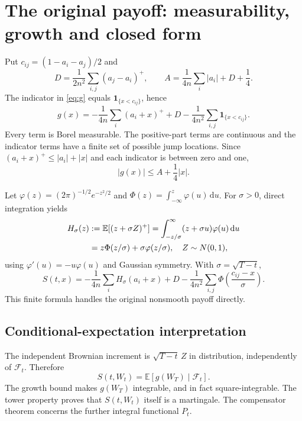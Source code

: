 \documentclass[11pt,letterpaper]{article}
\newcommand{\E}{\mathbb E}
\newcommand{\F}{\mathcal F}
\newcommand{\dd}{\,\mathrm d}
\newcommand{\ind}{\mathbf1}
\begin{document}
\section{The original payoff: measurability, growth and closed form}
Put $c_{ij}=(1-a_i-a_j)/2$ and
\begin{equation}\label{eq:constants}
D=\frac1{2n^2}\sum_{i,j}(a_j-a_i)^+,
\qquad
A=\frac1{4n}\sum_i|a_i|+D+\frac14.
\end{equation}
The indicator in \eqref{eq:g} equals $\ind_{\{x<c_{ij}\}}$, hence
\begin{equation}\label{eq:grewrite}
g(x)=-\frac1{4n}\sum_i(a_i+x)^++D
-\frac1{4n^2}\sum_{i,j}\ind_{\{x<c_{ij}\}}.
\end{equation}
Every term is Borel measurable. The positive-part terms are continuous and the indicator terms have a finite set of possible jump locations. Since $(a_i+x)^+\le|a_i|+|x|$ and each indicator is between zero and one,
\begin{equation}\label{eq:growthg}
\boxed{|g(x)|\le A+\frac14|x|.}
\end{equation}

Let $\varphi(z)=(2\pi)^{-1/2}e^{-z^2/2}$ and $\Phi(z)=\int_{-\infty}^z\varphi(u)\dd u$.
For $\sigma>0$, direct integration yields
\begin{align}
H_\sigma(z)&:=\E[(z+\sigma Z)^+]
=\int_{-z/\sigma}^{\infty}(z+\sigma u)\varphi(u)\dd u\notag\\
&=z\Phi(z/\sigma)+\sigma\varphi(z/\sigma),\quad Z\sim N(0,1),\label{eq:H}
\end{align}
using $\varphi'(u)=-u\varphi(u)$ and Gaussian symmetry. With $\sigma=\sqrt{T-t}$,
\begin{equation}\label{eq:Sexplicit}
\boxed{
S(t,x)=-\frac1{4n}\sum_iH_\sigma(a_i+x)+D
-\frac1{4n^2}\sum_{i,j}\Phi\!\left(\frac{c_{ij}-x}{\sigma}\right).}
\end{equation}
This finite formula handles the original nonsmooth payoff directly.

\subsection*{Conditional-expectation interpretation}
The independent Brownian increment is $\sqrt{T-t}\,Z$ in distribution, independently of $\F_t$. Therefore
\begin{equation}\label{eq:StCE}
S(t,W_t)=\E[g(W_T)\mid\F_t].
\end{equation}
The growth bound makes $g(W_T)$ integrable, and in fact square-integrable. The tower property proves that $S(t,W_t)$ itself is a martingale. The compensator theorem concerns the further integral functional $P_t$.
\end{document}
